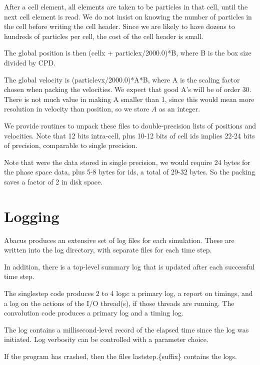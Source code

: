 \documentclass[11pt,preprint]{aastex}
\newcommand{\todo}{}
\newcommand{\todo}[1]{{\bf TODO: #1}}
\begin{document}
After a cell element, all elements are taken to be particles in
that cell, until the next cell element is read.  We do not insist
on knowing the number of particles in the cell before writing the
cell header.  Since we are likely to have dozens to hundreds of
particles per cell, the cost of the cell header is small.

The global position is then (cellx + particlex/2000.0)*B, where B
is the box size divided by CPD.  

The global velocity is (particlevx/2000.0)*A*B, where A is the
scaling factor chosen when packing the velocities.  We expect
that good A's will be of order 30.  There is not much value in 
making A smaller than 1, since this would mean more resolution 
in velocity than position, so we store $A$ as an integer. 

We provide routines to unpack these files to double-precision lists of
positions and velocities.  Note that 12 bits intra-cell, plus 10-12 bits
of cell ids implies 22-24 bits of precision, comparable to single precision.

Note that were the data stored in single precision, we would require
24 bytes for the phase space data, plus 5-8 bytes for ids, a total of 
29-32 bytes.  So the packing saves a factor of 2 in disk space.

\section{Logging}

Abacus produces an extensive set of log files for each simulation.
These are written into the log directory, with separate files for
each time step. 

\todo{In addition, there is a top-level summary log that is updated
after each successful time step.}

The singlestep code produces 2 to 4 logs: a primary log, a report
on timings, and a log on the actions of the I/O thread(s), if those
threads are running.  The convolution code produces a primary log
and a timing log.

The log contains a millisecond-level record of the elapsed time
since the log was initiated.  Log verbosity can be controlled with
a parameter choice.

If the program has crashed, then the files laststep.\{suffix\} contains
the logs.
\end{document}
